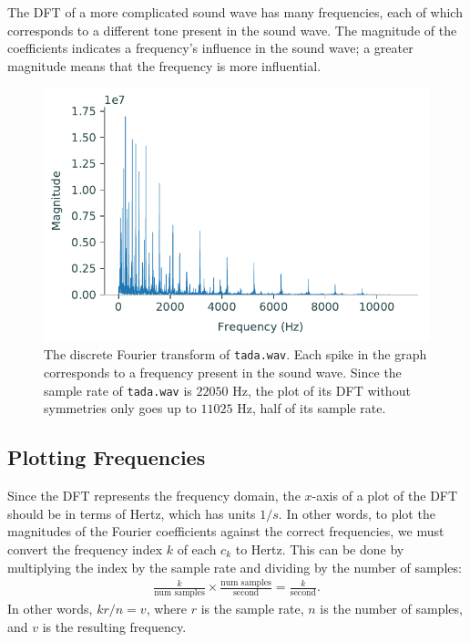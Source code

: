 The DFT of a more complicated sound wave has many frequencies, each of which corresponds to a different tone present in the sound wave.
The magnitude of the coefficients indicates a frequency's influence in the sound wave; a greater magnitude means that the frequency is more influential.

\begin{figure}[H]
\centering
\includegraphics[width=.7\textwidth]{figures/dft_tada.pdf}
\caption{The discrete Fourier transform of \texttt{tada.wav}.
Each spike in the graph corresponds to a frequency present in the sound wave.
Since the sample rate of \texttt{tada.wav} is $22050$ Hz, the plot of its DFT without symmetries only goes up to $11025$ Hz, half of its sample rate.}
\label{fig:dft_tada}
\end{figure}

\subsection*{Plotting Frequencies} %

Since the DFT represents the frequency domain, the $x$-axis of a plot of the DFT should be in terms of Hertz, which has units $1/s$.
In other words, to plot the magnitudes of the Fourier coefficients against the correct frequencies, we must convert the frequency index $k$ of each $c_k$ to Hertz.
This can be done by multiplying the index by the sample rate and dividing by the number of samples:
\begin{align}
\label{eq:fft-cycles-conversion}
\frac{k}{\mbox{num samples}} \times \frac{\mbox{num samples}}{\mbox{second}}
= \frac{k}{\mbox{second}}.
\end{align}
In other words, $kr/n = v$, where $r$ is the sample rate, $n$ is the number of samples, and $v$ is the resulting frequency.

